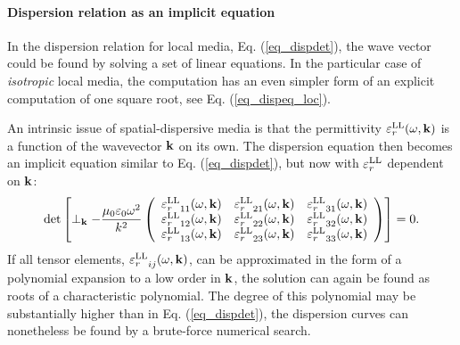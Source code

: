 \paragraph{Dispersion relation as an implicit equation} %
In the dispersion relation for local media, Eq. (\ref{eq_dispdet}), the wave vector could be found by solving a set of linear equations. In the particular case of \textit{isotropic} local media, the computation has an even simpler form of an explicit computation of one square root, see Eq. (\ref{eq_dispeq_loc}).

An intrinsic issue of spatial-dispersive media is that the permittivity $\varepsilon_r^\text{LL}(\omega,{\mathbf{k}})$ is a function of the wavevector ${\mathbf{k}}$ on its own. The dispersion equation then becomes an implicit equation similar to Eq. (\ref{eq_dispdet}), but now with $\varepsilon_r^\text{LL}$ dependent on ${\mathbf{k}}$: 
\begin{equation} 
\det\left[
\perp_{\mathbf{k}} -
	\frac{\mu_0 \varepsilon_0 \omega^2}{k^2}
	\left(\begin{array}{ccc} 
	{\varepsilon_r^\text{LL}}_{11}(\omega,{\mathbf{k}}) & {\varepsilon_r^\text{LL}}_{21}(\omega,{\mathbf{k}}) & {\varepsilon_r^\text{LL}}_{31}(\omega,{\mathbf{k}})  \\
	{\varepsilon_r^\text{LL}}_{12}(\omega,{\mathbf{k}}) & {\varepsilon_r^\text{LL}}_{22}(\omega,{\mathbf{k}}) & {\varepsilon_r^\text{LL}}_{32}(\omega,{\mathbf{k}})  \\
	{\varepsilon_r^\text{LL}}_{13}(\omega,{\mathbf{k}}) & {\varepsilon_r^\text{LL}}_{23}(\omega,{\mathbf{k}}) & {\varepsilon_r^\text{LL}}_{33}(\omega,{\mathbf{k}})  
	\end{array} \right) \right] = 0. \label{eq_dispdetLL}\end{equation}
If all tensor elements, ${\varepsilon_r^\text{LL}}_{ij}(\omega,{\mathbf{k}})$, can be approximated in the form of a polynomial expansion to a low order in ${\mathbf{k}}$, the solution can again be found as roots of a characteristic polynomial. The degree of this polynomial may be substantially higher than in Eq. (\ref{eq_dispdet}), the dispersion curves can nonetheless be found by a brute-force numerical search. %
